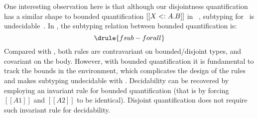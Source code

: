 \renewcommand\ottaltinferrule[4]{
  \inferrule*[narrower=0.8,right=#1,#2]
    {#3}
    {#4}
}


One interesting observation here is that although our disjointness
quantification has a similar shape to bounded quantification $[[\/X<:A. B]]$ in
\fsub~\citep{cardelli1985understanding}, subtyping for \fsub~is
undecidable~\citep{pierce1994bounded}. In \fsub, the subtyping relation between
bounded quantification is:
{\small
\[
  \drule{fsub-forall}
\]
}%
Compared with , both rules are contravariant on
bounded/disjoint types, and covariant on the body. However, with bounded
quantification it is fundamental to track the bounds in the
environment, which complicates the design of the rules and makes
subtyping undecidable with .
Decidability can be recovered
by employing an invariant rule for bounded quantification
(that is by forcing $[[A1]]$ and $[[A2]]$ to be identical).
Disjoint quantification does not require such invariant rule for
decidability.

\renewcommand\ottaltinferrule[4]{
  \inferrule*[narrower=0.6,lab=#1,#2]
    {#3}
    {#4}
}


\begin{comment}
For example, in the original
type $[[\/X<:A1. B1]]$, the $[[X]]$ in $[[B1]]$ is thought of being bound to
$[[A1]]$, the premise $[[DD, X <: A2 |- B1 <: B2]]$ forces $[[X]]$ to be bound
to $[[A2]]$ in $[[B1]]$. This destroys the original connection and makes it
impossible to give a decision procedure.
\end{comment}


